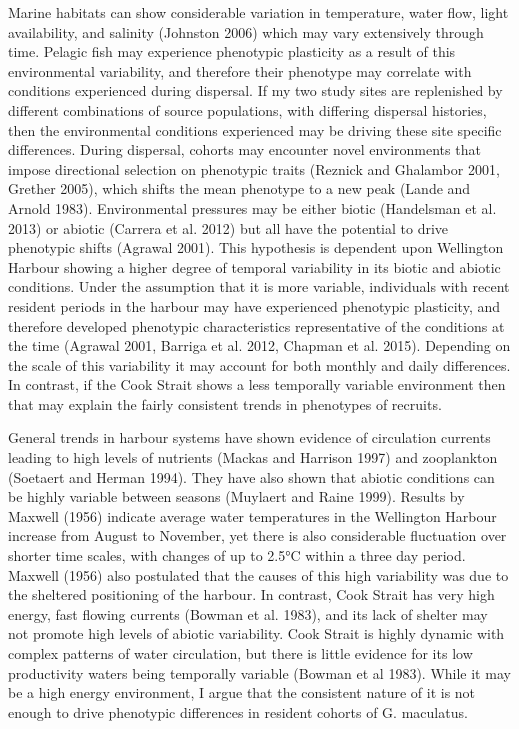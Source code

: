 \documentclass[]{book}
\begin{document}
Marine habitats can show considerable variation in temperature, water
flow, light availability, and salinity (Johnston 2006) which may vary
extensively through time. Pelagic fish may experience phenotypic
plasticity as a result of this environmental variability, and therefore
their phenotype may correlate with conditions experienced during
dispersal. If my two study sites are replenished by different
combinations of source populations, with differing dispersal histories,
then the environmental conditions experienced may be driving these site
specific differences. During dispersal, cohorts may encounter novel
environments that impose directional selection on phenotypic traits
(Reznick and Ghalambor 2001, Grether 2005), which shifts the mean
phenotype to a new peak (Lande and Arnold 1983). Environmental pressures
may be either biotic (Handelsman et al. 2013) or abiotic (Carrera et al.
2012) but all have the potential to drive phenotypic shifts (Agrawal
2001). This hypothesis is dependent upon Wellington Harbour showing a
higher degree of temporal variability in its biotic and abiotic
conditions. Under the assumption that it is more variable, individuals
with recent resident periods in the harbour may have experienced
phenotypic plasticity, and therefore developed phenotypic
characteristics representative of the conditions at the time (Agrawal
2001, Barriga et al. 2012, Chapman et al. 2015). Depending on the scale
of this variability it may account for both monthly and daily
differences. In contrast, if the Cook Strait shows a less temporally
variable environment then that may explain the fairly consistent trends
in phenotypes of recruits.

General trends in harbour systems have shown evidence of circulation
currents leading to high levels of nutrients (Mackas and Harrison 1997)
and zooplankton (Soetaert and Herman 1994). They have also shown that
abiotic conditions can be highly variable between seasons (Muylaert and
Raine 1999). Results by Maxwell (1956) indicate average water
temperatures in the Wellington Harbour increase from August to November,
yet there is also considerable fluctuation over shorter time scales,
with changes of up to 2.5°C within a three day period. Maxwell (1956)
also postulated that the causes of this high variability was due to the
sheltered positioning of the harbour. In contrast, Cook Strait has very
high energy, fast flowing currents (Bowman et al. 1983), and its lack of
shelter may not promote high levels of abiotic variability. Cook Strait
is highly dynamic with complex patterns of water circulation, but there
is little evidence for its low productivity waters being temporally
variable (Bowman et al 1983). While it may be a high energy environment,
I argue that the consistent nature of it is not enough to drive
phenotypic differences in resident cohorts of G. maculatus.
\end{document}
